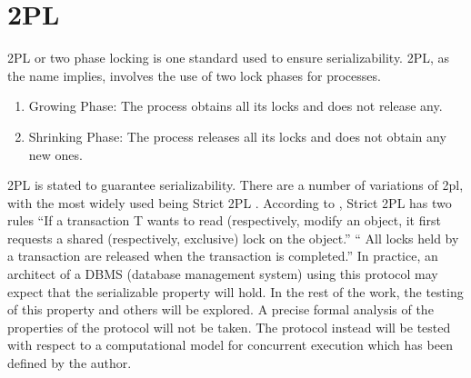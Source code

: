 \section{2PL}
2PL or two phase locking is one standard used to ensure serializability. 2PL, as the name implies, involves the use of two lock phases for processes.

\begin{enumerate}
\item Growing Phase: The process obtains all its locks and does not release any.
\item Shrinking Phase: The process releases all its locks and does not obtain any new ones.
\end{enumerate}

2PL is stated to guarantee serializability. There are a number of variations of 2pl, with the most widely used being Strict 2PL \cite{textbook}. According to \cite{textbook}, Strict 2PL has two rules 
“If a transaction T wants to read (respectively, modify an object, it first requests a shared (respectively, exclusive) lock on the object.”
“ All locks held by a transaction are released when the transaction is completed.”
In practice, an architect of a DBMS (database management system) using this protocol may expect that the serializable property will hold. In the rest of the work, the testing of this property and others will be explored. A precise formal analysis of the properties of the protocol will not be taken. The protocol instead will be tested with respect to a computational model for concurrent execution which has been defined by the author.


